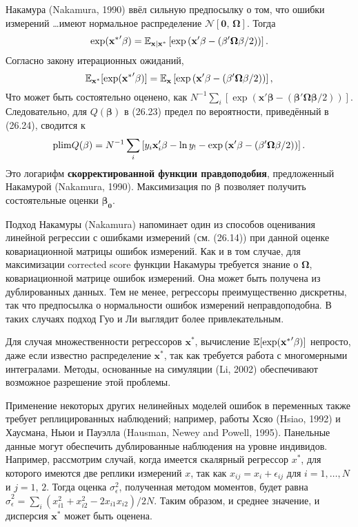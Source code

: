 Накамура (Nakamura, 1990) ввёл сильную предпосылку о том, что ошибки измерений \ldots имеют нормальное распределение $\mathcal{N}[\mathbf{0}, \, \mathbf{\Omega}]$. Тогда
\[
\exp (\mathbf{x^*}' \mathbf{\beta}) = \mathbb{E}_{\mathbf{x|x^*}} \left[ \exp \left(\mathbf{x}' \mathbf{\beta} - (\mathbf{\beta' \Omega \beta} /2) \right) \right].
\]
Согласно закону итерационных ожиданий,
\[
\mathbb{E}_{\mathbf{x^*}} [\exp (\mathbf{x^*}' \mathbf{\beta})] = \mathbb{E}_{\mathbf{x}} \left[ \exp \left(\mathbf{x}' \mathbf{\beta} - (\mathbf{\beta' \Omega \beta} /2) \right) \right],
\]
Что может быть состоятельно оценено, как $N^{-1} \sum \limits_i [ \exp (\mathbf{x}' \mathbf{\beta} - (\mathbf{\beta' \Omega \beta} /2) )]$. Следовательно, для $Q(\mathbf{\beta})$ в (26.23) предел по вероятности, приведённый в (26.24), сводится к
\[
\mathrm{plim } Q(\mathbf{\beta}) = N^{-1} \sum \limits_i \left[ y_i \mathbf{x}'_i \mathbf{\beta} - \ln y_! - \exp \left(\mathbf{x}' \mathbf{\beta} - (\mathbf{\beta' \Omega \beta} /2) \right) \right].
\]
Это логарифм {\bf скорректированной функции правдоподобия}, предложенный Накамурой (Nakamura, 1990). Максимизация по $\mathbf{\beta}$ позволяет получить состоятельные оценки $\mathbf{\beta_0}$.

Подход Накамуры (Nakamura) напоминает один из способов оценивания линейной регрессии с ошибками измерений (см. (26.14)) при данной оценке ковариационной матрицы ошибок измерений. Как и в том случае, для максимизации corrected score функции Накамуры требуется знание о $\mathbf{\Omega}$, ковариационной матрице ошибок измерений. Она может быть получена из дублированных данных. Тем не менее, регрессоры преимущественно дискретны, так что предпосылка о нормальности ошибок измерений неправдоподобна. В таких случаях подход Гуо и Ли выглядит более привлекательным.

Для случая множественности регрессоров $\mathbf{x^*}$, вычисление $\mathbb{E} [\exp (\mathbf{x^*}' \mathbf{\beta})]$ непросто, даже если известно распределение $\mathbf{x^*}$, так как требуется работа с многомерными интегралами. Методы, основанные на симуляции (Li, 2002) обеспечивают возможное разрешение этой проблемы.

Применение некоторых других нелинейных моделей ошибок в переменных также требует реплицированных наблюдений; например, работы Хсяо (Hsiao, 1992) и Хаусмана, Ньюи и Пауэлла (Hausman, Newey and Powell, 1995). Панельные данные могут обеспечить дублированные наблюдения на уровне индивидов. Например, рассмотрим случай, когда имеется скалярный регрессор $x^*$, для которого имеются две реплики измерений $x$, так как $x_{ij} = x_i + \epsilon_{ij}$ для $i=1,\dots,N$ и $j=1, \, 2$. Тогда оценка $\sigma^2_{\epsilon}$, полученная методом моментов, будет равна $\widehat{\sigma}^2_{\epsilon} = \sum \limits_i (x^2_{i1}+x^2_{i2} - 2x_{i1}x_{i2})/2N$. Таким образом, и среднее значение, и дисперсия $\mathbf{x^*}$ может быть оценена.
 
